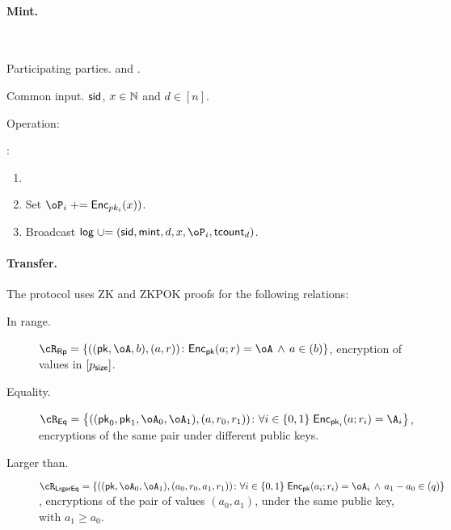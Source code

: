 \paragraph{Mint.}
\begin{protocol}~\label{prot:ConfidentialTransactions:Mint}
	\item[Participating parties.] \Mc and \Cc.
	
	
	
	\item[Common input.] $\mathsf{sid}$, $x\in {\mathbb{N}}$ and $d\in [n]$.
	
	\item[Operation:]  \Cc~
	
		\item \Cc:  
		\begin{enumerate}
			\item {}
			
			\item Set $\oP_i \pluseq \Enc_{pk_i}(x))$.
				
		\item Broadcast $\historylog \unioneq (\sid,\mint,d,x,\oP_i,\tcount_d)$.
				 	
		
	\end{enumerate}
\end{protocol}

\paragraph{Transfer.}

The protocol uses ZK and ZKPOK proofs for the   following  relations:

\begin{description}
	\item[In range.] $\rRp =\rRpDef$, \ie  encryption of values in $[p_{\mathsf{size}}]$.
	
	\item[Equality.] $\rEq =\rEqDef$, \ie  encryptions of the same pair under different public keys.
	
	\item[Larger than.] $\rLrgEq =\rLrgEqDef$, \ie encryptions of the  pair of values $(a_0,a_1)$, under the same public key, with $a_1 \ge a_0$.
\end{description}




